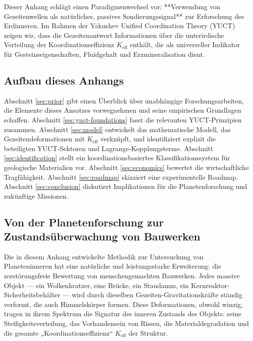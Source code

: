\documentclass[12pt,a4paper]{article}
\theoremstyle{remark}
\newcommand{\Keff}{K_{\mathrm{eff}}}
\begin{document}
	Dieser Anhang schlägt einen Paradigmenwechsel vor: **Verwendung von Gezeitenwellen als natürliches, passives Sondierungssignal** zur Erforschung des Erdinneren. Im Rahmen der Yakushev Unified Coordination Theory (YUCT) zeigen wir, dass die Gezeitenantwort Informationen über die unterirdische Verteilung der Koordinationseffizienz $\Keff$ enthält, die als universeller Indikator für Gesteinseigenschaften, Fluidgehalt und Erzmineralisation dient.
	
	\subsection{Aufbau dieses Anhangs}
	
	Abschnitt \ref{sec:prior} gibt einen Überblick über unabhängige Forschungsarbeiten, die Elemente dieses Ansatzes vorwegnehmen und seine empirischen Grundlagen schaffen. Abschnitt \ref{sec:yuct-foundations} fasst die relevanten YUCT-Prinzipien zusammen. Abschnitt \ref{sec:model} entwickelt das mathematische Modell, das Gezeitendeformationen mit $\Keff$ verknüpft, und identifiziert explizit die beteiligten YUCT-Sektoren und Lagrange-Kopplungsterme. Abschnitt \ref{sec:identification} stellt ein koordinationsbasiertes Klassifikationssystem für geologische Materialien vor. Abschnitt \ref{sec:economics} bewertet die wirtschaftliche Tragfähigkeit. Abschnitt \ref{sec:roadmap} skizziert eine experimentelle Roadmap. Abschnitt \ref{sec:conclusion} diskutiert Implikationen für die Planetenforschung und zukünftige Missionen.
	
	\subsection{Von der Planetenforschung zur Zustandsüberwachung von Bauwerken}
	\label{sec:beyond-geophysics}
	
	Die in diesem Anhang entwickelte Methodik zur Untersuchung von Planeteninneren hat eine natürliche und leistungsstarke Erweiterung: die zerstörungsfreie Bewertung von menschengemachten Bauwerken. Jedes massive Objekt — ein Wolkenkratzer, eine Brücke, ein Staudamm, ein Kernreaktor-Sicherheitsbehälter — wird durch dieselben Gezeiten-Gravitationskräfte ständig verformt, die auch Himmelskörper formen. Diese Deformationen, obwohl winzig, tragen in ihrem Spektrum die Signatur des inneren Zustands des Objekts: seine Steifigkeitsverteilung, das Vorhandensein von Rissen, die Materialdegradation und die gesamte „Koordinationseffizienz“ \(K_{\mathrm{eff}}\) der Struktur.
	
\end{document}
